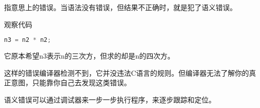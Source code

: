 \begin{frame}[fragile]
\begin{defn}[]{}
指意思上的错误。当语法没有错误，但结果不正确时，就是犯了语义错误。
\end{defn}\pause 

观察代码
\begin{lstlisting}[language=c,frame=tb]
n3 = n2 * n2;
\end{lstlisting}
它原本希望n3表示n的三次方，但求的却是n的四次方。\pause \vspace{0.1in}


这样的错误编译器检测不到，它并没违法C语言的规则。但编译器无法了解你的真正意图，只能靠你自己去发现这类错误。
\end{frame}


\begin{frame}[fragile]
语义错误可以通过调试器来一步一步执行程序，来逐步跟踪和定位。
\end{frame}

